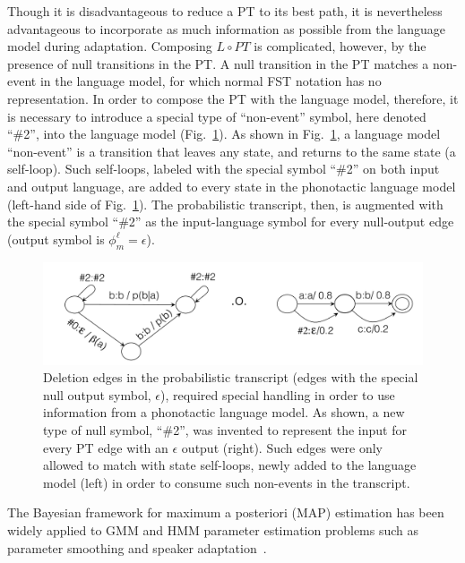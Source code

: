 Though it is disadvantageous to reduce a PT to its best path, it is
nevertheless advantageous to incorporate as much information as
possible from the language model during adaptation.  Composing $L\circ
PT$ is complicated, however, by the presence of null transitions in
the PT.  A null transition in the PT matches a non-event in the
language model, for which normal FST notation has no representation.
In order to compose the PT with the language model, therefore, it is
necessary to introduce a special type of ``non-event'' symbol, here
denoted ``\#2'', into the language model (Fig.~\ref{fig:liu1}).  As
shown in Fig.~\ref{fig:liu1}, a language model ``non-event'' is a
transition that leaves any state, and returns to the same state (a
self-loop).  Such self-loops, labeled with the special symbol ``\#2''
on both input and output language, are added to every state in the
phonotactic language model (left-hand side of Fig.~\ref{fig:liu1}).
The probabilistic transcript, then, is augmented with the special
symbol ``\#2'' as the input-language symbol for every null-output edge
(output symbol is $\phi_m^\ell =\epsilon$).

\begin{figure}
  \centerline{\includegraphics[width=5in]{../figs/liu1.png}}
  \caption{Deletion edges in the probabilistic transcript (edges with
    the special null output symbol, $\epsilon$), required special
    handling in order to use information from a phonotactic language
    model.  As shown, a new type of null symbol, ``\#2'', was invented
    to represent the input for every PT edge with an $\epsilon$ output
    (right).  Such edges were only allowed to match with state
    self-loops, newly added to the language model (left) in order to
    consume such non-events in the transcript.}
  \label{fig:liu1}
\end{figure}

The Bayesian framework for maximum a posteriori (MAP) estimation has
been widely applied to GMM and HMM parameter estimation problems such
as parameter smoothing and speaker
adaptation~\cite{gauvain1994maximum}.

